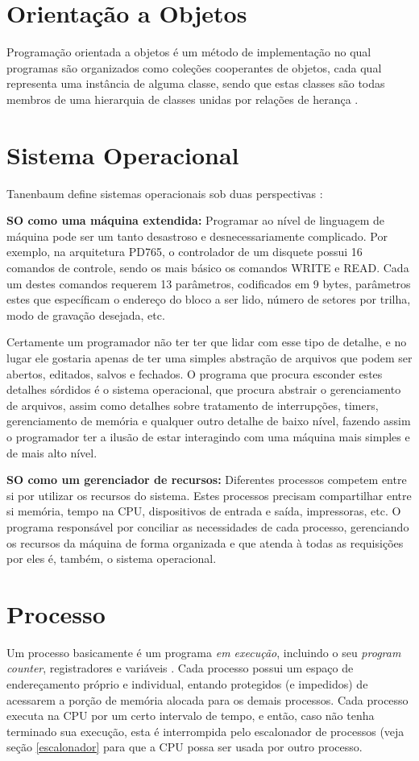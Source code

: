\section{Orientação a Objetos}
Programação orientada a objetos é um método de implementação no qual programas são organizados como coleções cooperantes de objetos, cada qual representa uma instância de alguma classe, sendo que estas classes são todas membros de uma hierarquia de classes unidas por relações de herança \cite{OOAD}.



\section{Sistema Operacional}
Tanenbaum define sistemas operacionais sob duas perspectivas \cite{tanenbaum}:

\textbf{SO como uma máquina extendida:}
Programar ao nível de linguagem de máquina pode ser um tanto desastroso e desnecessariamente complicado. Por exemplo, na arquitetura PD765, o controlador de um disquete possui 16 comandos de controle, sendo os mais básico os comandos WRITE e READ. Cada um destes comandos requerem 13 parâmetros, codificados em 9 bytes, parâmetros estes que específicam o endereço do bloco a ser lido, número de setores por trilha, modo de gravação desejada, etc.

Certamente um programador não ter ter que lidar com esse tipo de detalhe, e no lugar ele gostaria apenas de ter uma simples abstração de arquivos que podem ser abertos, editados, salvos e fechados.
O programa que procura esconder estes detalhes sórdidos é o sistema operacional, que procura abstrair o gerenciamento de arquivos, assim como detalhes sobre tratamento de interrupções, timers, gerenciamento de memória e qualquer outro detalhe de baixo nível, fazendo assim o programador ter a ilusão de estar interagindo com uma máquina mais simples e de mais alto nível.

\textbf{SO como um gerenciador de recursos:}
Diferentes processos competem entre si por utilizar os recursos do sistema. Estes processos precisam compartilhar entre si memória, tempo na CPU, dispositivos de entrada e saída, impressoras, etc. O programa responsável por conciliar as necessidades de cada processo, gerenciando os recursos da máquina de forma organizada e que atenda à todas as requisições por eles é, também, o sistema operacional.

\section{Processo}
Um processo basicamente é um programa \emph{em execução}, incluindo o seu \emph{program counter}, registradores e variáveis \cite{tanenbaum}. Cada processo possui um espaço de endereçamento próprio e individual, entando protegidos (e impedidos) de acessarem a porção de memória alocada para os demais processos. Cada processo executa na CPU por um certo intervalo de tempo, e então, caso não tenha terminado sua execução, esta é interrompida pelo escalonador de processos (veja seção \ref{escalonador} para que a CPU possa ser usada por outro processo.

